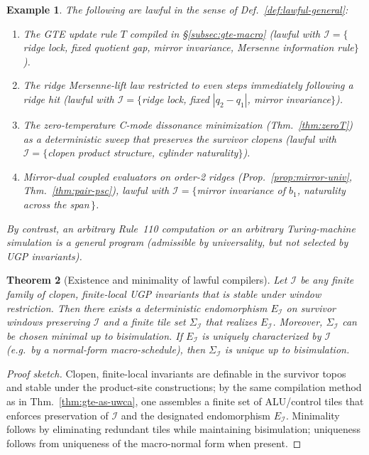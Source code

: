 \documentclass[12pt]{article}
\newtheorem{theorem}{Theorem}[section]
\newtheorem{example}[theorem]{Example}
\numberwithin{equation}{section}
\begin{document}
\begin{example}\label{ex:lawful-examples}
The following are \emph{lawful} in the sense of Def.~\ref{def:lawful-general}:
\begin{enumerate}[label=(\roman*), itemsep=2pt]
\item The GTE update rule $T$ compiled in \S\ref{subsec:gte-macro} (lawful with $\mathcal{I}=\{$ridge lock, fixed quotient gap, mirror invariance, Mersenne information rule$\}$).
\item The ridge Mersenne-lift law restricted to even steps immediately following a ridge hit (lawful with $\mathcal{I}=\{$ridge lock, fixed $|q_2-q_1|$, mirror invariance$\}$).
\item The zero-temperature C-mode dissonance minimization (Thm.~\ref{thm:zeroT}) as a deterministic sweep that preserves the survivor clopens (lawful with $\mathcal{I}=\{$clopen product structure, cylinder naturality$\}$).
\item Mirror-dual coupled evaluators on order-2 ridges (Prop.~\ref{prop:mirror-univ}, Thm.~\ref{thm:pair-psc}), lawful with $\mathcal{I}=\{$mirror invariance of $b_1$, naturality across the span$\,\}$.
\end{enumerate}
By contrast, an arbitrary Rule~110 computation or an arbitrary Turing-machine simulation is a \emph{general} program (admissible by universality, but not selected by UGP invariants).
\end{example}

\begin{theorem}[Existence and minimality of lawful compilers]\label{thm:lawful-existence}
Let $\mathcal{I}$ be any finite family of clopen, finite-local UGP invariants that is stable under window restriction. Then there exists a deterministic endomorphism $E_{\mathcal{I}}$ on survivor windows preserving $\mathcal{I}$ and a finite tile set $\Sigma_{\mathcal{I}}$ that realizes $E_{\mathcal{I}}$. Moreover, $\Sigma_{\mathcal{I}}$ can be chosen minimal up to bisimulation. If $E_{\mathcal{I}}$ is uniquely characterized by $\mathcal{I}$ (e.g.\ by a normal-form macro-schedule), then $\Sigma_{\mathcal{I}}$ is unique up to bisimulation.
\end{theorem}

\begin{proof}[Proof sketch]
Clopen, finite-local invariants are definable in the survivor topos and stable under the product-site constructions; by the same compilation method as in Thm.~\ref{thm:gte-as-uwca}, one assembles a finite set of ALU/control tiles that enforces preservation of $\mathcal{I}$ and the designated endomorphism $E_{\mathcal{I}}$. Minimality follows by eliminating redundant tiles while maintaining bisimulation; uniqueness follows from uniqueness of the macro-normal form when present.
\end{proof}
\end{document}

